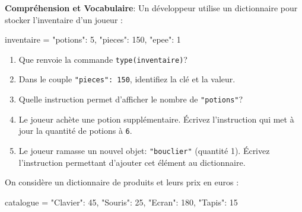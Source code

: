 \documentclass[11pt, a4paper]{report}
\def\ptsexoA{3}
\def\ptsexoB{2}
\begin{document}
\def\level{Premiere}  %
\def\course{NSI}
\def\chaptername{Les dictionnaires} %
\def\docname{DS\quad}        %

\pagestyle{DS_LP}

\NomPrenomNote{}

\bigskip


\exods{\ptsexoA} 

\textbf{Compréhension et Vocabulaire}: Un développeur utilise un dictionnaire pour stocker l'inventaire d'un joueur :
\begin{CodePythontexAlt}[TaillePolice=\large, Largeur=1\linewidth,Centre,Lignes=true,PremLigne=1]{}
inventaire = {"potions": 5, "pieces": 150, "epee": 1}
\end{CodePythontexAlt}

\begin{enumerate}
    \item Que renvoie la commande \verb|type(inventaire)|? \hfill {}
    \item Dans le couple \texttt{"pieces": 150}, identifiez la clé et la valeur. \hfill {}
    \item Quelle instruction permet d'afficher le nombre de \texttt{"potions"}? \hfill {}
    \item Le joueur achète une potion supplémentaire. Écrivez l'instruction qui met à jour la quantité de potions à \texttt{6}. \hfill {}
    \item Le joueur ramasse un nouvel objet: \texttt{"bouclier"} (quantité 1). Écrivez l'instruction permettant d'ajouter cet élément au dictionnaire. \hfill {}
\end{enumerate}

\exods{\ptsexoB} 

On considère un dictionnaire de produits et leurs prix en euros :
\begin{CodePythontexAlt}[TaillePolice=\large, Largeur=1\linewidth,Centre,Lignes=true,PremLigne=1]{}
catalogue = {"Clavier": 45, "Souris": 25, "Ecran": 180, "Tapis": 15}
\end{CodePythontexAlt}
\end{document}
